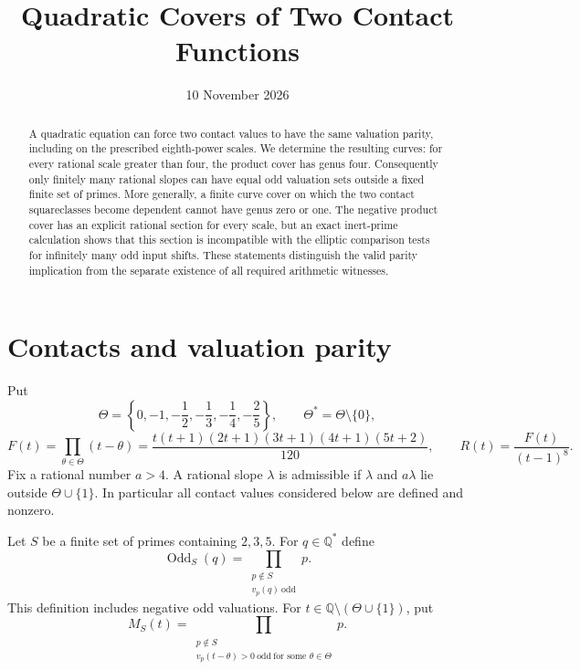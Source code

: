 \documentclass[11pt,a4paper]{article}
\title{Quadratic Covers of Two Contact Functions}
\author{}\date{10 November 2026}
\newcommand{\Q}{\mathbb Q}\newcommand{\Z}{\mathbb Z}
\DeclareMathOperator{\Odd}{Odd}
\begin{document}
\maketitle
\begin{abstract}
A quadratic equation can force two contact values to have the
same valuation parity, including on the prescribed eighth-power
scales. We determine the resulting curves: for every rational
scale greater than four, the product cover has genus four.
Consequently only finitely many rational slopes can have equal
odd valuation sets outside a fixed finite set of primes.
More generally, a finite curve cover on which the two contact
squareclasses become dependent cannot have genus zero or one.
The negative product cover has an explicit rational section for
every scale, but an exact inert-prime calculation shows that this
section is incompatible with the elliptic comparison tests for
infinitely many odd input shifts. These statements distinguish
the valid parity implication from the separate existence of all
required arithmetic witnesses.
\end{abstract}

\section{Contacts and valuation parity}

Put
\[
 \Theta=\left\{0,-1,-\frac12,-\frac13,-\frac14,-\frac25\right\},
 \qquad \Theta^*=\Theta\setminus\{0\},
\]
\begin{equation}\label{eq:R}
 F(t)=\prod_{\theta\in\Theta}(t-\theta)
 =\frac{t(t+1)(2t+1)(3t+1)(4t+1)(5t+2)}{120},
 \qquad R(t)=\frac{F(t)}{(t-1)^8}.
\end{equation}
Fix a rational number $a>4$. A rational slope $\lambda$ is
admissible if $\lambda$ and $a\lambda$ lie outside
$\Theta\cup\{1\}$. In particular all contact values considered
below are defined and nonzero.

Let $S$ be a finite set of primes containing $2,3,5$. For
$q\in\Q^*$ define
\[
 \Odd_S(q)=\prod_{\substack{p\notin S\\v_p(q)\ \mathrm{odd}}}p.
\]
This definition includes negative odd valuations. For
$t\in\Q\setminus(\Theta\cup\{1\})$, put
\[
 M_S(t)=\prod_{\substack{p\notin S\\
    v_p(t-\theta)>0\ \mathrm{odd}\ \text{for some }\theta\in\Theta}}p.
\]
\end{document}
